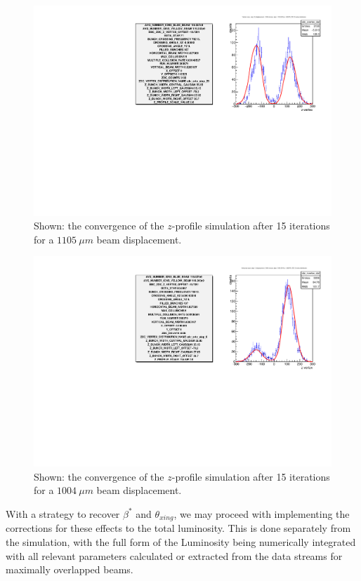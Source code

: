 \begin{figure}
  \centering
  \includegraphics[width=\textwidth]{./figures/1105_micron_step.pdf}
  \caption{
    Shown: the convergence of the $z$-profile simulation after 15 iterations for
    a $1105~\mu m$ beam displacement. 
  }
  \label{fig:profile_3}
\end{figure}

\begin{figure}
  \centering
  \includegraphics[width=\textwidth]{./figures/more_statistics.pdf}
  \caption{
    Shown: the convergence of the $z$-profile simulation after 15 iterations for
    a $1004~\mu m$ beam displacement. 
  }
  \label{fig:profile_4}
\end{figure}

With a strategy to recover $\beta^*$ and $\theta_{xing}$, we may proceed with
implementing the corrections for these effects to the total luminosity. This is
done separately from the simulation, with the full form of the Luminosity being
numerically integrated with all relevant parameters calculated or extracted from
the data streams for maximally overlapped beams.

